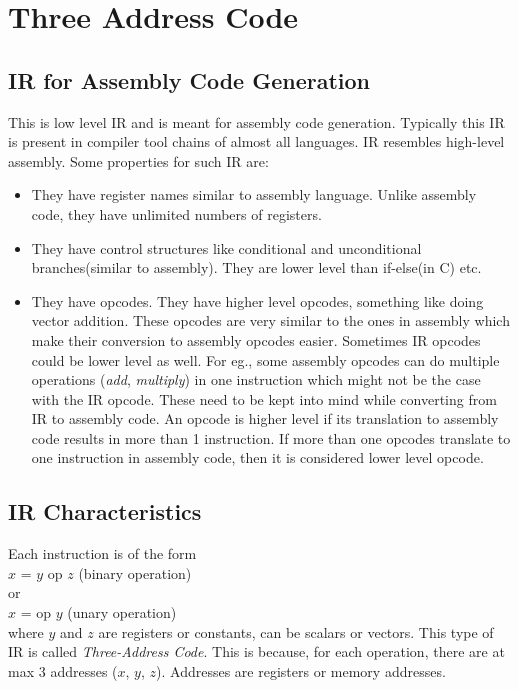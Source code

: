 \section{Three Address Code}
\subsection{IR for Assembly Code Generation}
This is low level IR and is meant for assembly code generation. Typically this IR is present in compiler tool chains of almost all languages.
IR resembles high-level assembly. Some properties for such IR are:
\begin{itemize}
    \item  They have register names similar to assembly language. Unlike assembly code, they have unlimited numbers of registers.
    \item They have control structures like conditional and unconditional branches(similar to assembly). They are lower level than if-else(in C) etc.
    \item They have opcodes. They have higher level opcodes, something like doing vector addition. These opcodes are very similar to the ones in assembly which make their conversion to assembly opcodes easier. Sometimes IR opcodes could be lower level as well. For eg., some assembly opcodes can do multiple operations (\emph{add}, \emph{multiply}) in one instruction which might not be the case with the IR opcode. These need to be kept into mind while converting from IR to assembly code.
    An opcode is higher level if its translation to assembly code results in more than 1 instruction. If more than one opcodes translate to one instruction in assembly code, then it is considered lower level opcode.
\end{itemize}

\subsection{IR Characteristics}
Each instruction is of the form\\

$x$ = $y$ op $z$  (binary operation)
\\
or
\\

$x$ = op $y$ (unary operation)\\
where $y$ and $z$ are registers or constants, can be scalars or vectors.
This type of IR is called \emph{Three-Address Code}. This is because, for each operation, there are at max 3 addresses ($x$, $y$, $z$). Addresses are registers or memory addresses.

